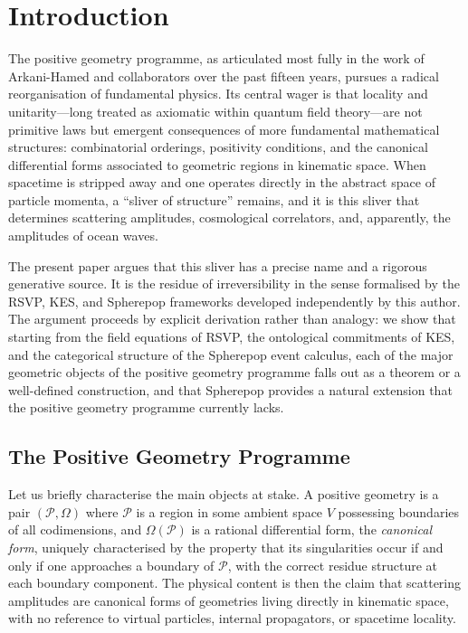 \documentclass[12pt, oneside]{amsart}
\theoremstyle{plain}
\theoremstyle{definition}
\theoremstyle{remark}
\newcommand{\CF}{\Omega}   %
\begin{document}
\section{Introduction}

The positive geometry programme, as articulated most fully in the work of Arkani-Hamed and collaborators over the past fifteen years, pursues a radical reorganisation of fundamental physics. Its central wager is that locality and unitarity---long treated as axiomatic within quantum field theory---are not primitive laws but emergent consequences of more fundamental mathematical structures: combinatorial orderings, positivity conditions, and the canonical differential forms associated to geometric regions in kinematic space. When spacetime is stripped away and one operates directly in the abstract space of particle momenta, a ``sliver of structure'' remains, and it is this sliver that determines scattering amplitudes, cosmological correlators, and, apparently, the amplitudes of ocean waves.

The present paper argues that this sliver has a precise name and a rigorous generative source. It is the residue of irreversibility in the sense formalised by the RSVP, KES, and Spherepop frameworks developed independently by this author. The argument proceeds by explicit derivation rather than analogy: we show that starting from the field equations of RSVP, the ontological commitments of KES, and the categorical structure of the Spherepop event calculus, each of the major geometric objects of the positive geometry programme falls out as a theorem or a well-defined construction, and that Spherepop provides a natural extension that the positive geometry programme currently lacks.

\subsection{The Positive Geometry Programme}

Let us briefly characterise the main objects at stake. A positive geometry is a pair $(\mathcal{P}, \CF)$ where $\mathcal{P}$ is a region in some ambient space $V$ possessing boundaries of all codimensions, and $\CF(\mathcal{P})$ is a rational differential form, the \emph{canonical form}, uniquely characterised by the property that its singularities occur if and only if one approaches a boundary of $\mathcal{P}$, with the correct residue structure at each boundary component. The physical content is then the claim that scattering amplitudes are canonical forms of geometries living directly in kinematic space, with no reference to virtual particles, internal propagators, or spacetime locality.
\end{document}
